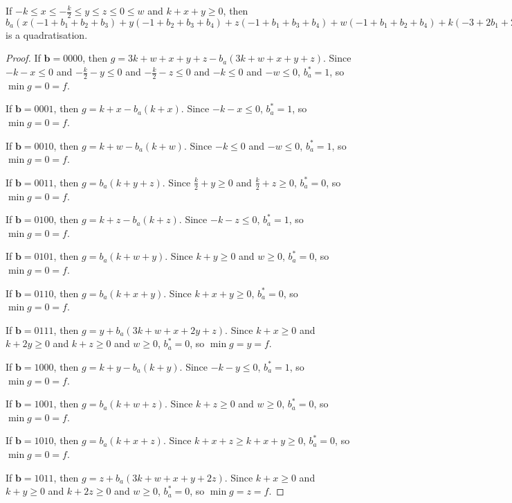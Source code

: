 \documentclass[11pt]{scrartcl}
\newcommand{\vc}[1]{\boldsymbol{#1}}
\begin{document}
\begin{lemma}
 If $-k\le x \le -\frac{k}{2} \le y \le z \le 0 \le w$ and $k + x+ y \ge 0$, then $b_a(x(-1+b_1+b_2+b_3)+y(-1+b_2+b_3+b_4)+z(-1+b_1+b_3+b_4)+w(-1+b_1+b_2+b_4)+k(-3+2b_1+2b_2+2b_3+2b_4))+x(+1 -b_1-b_2-b_3+b_1b_2+b_1b_3+b_2b_3)+y(+1 -b_2-b_3-b_4+b_2b_3+b_2b_4+b_3b_4)+z(+1 -b_1-b_3-b_4+b_1b_3+b_1b_4+b_3b_4)+w(+1 -b_1-b_2-b_4+b_1b_2+b_1b_4+b_2b_4)+k(+3 -2 b_1-2 b_2-2 b_3-2 b_4+b_1b_2+b_1b_3+b_1b_4+b_2b_3+b_2b_4+b_3b_4)$ is a quadratisation.\\
 \end{lemma}

\begin{proof}
If $\vc b = 0000$, then $g = 3k + w + x + y + z - b_a(3k + w + x + y + z)$.
Since $-k - x \le 0$ and $-\frac{k}{2} - y \le 0$ and $-\frac{k}{2} - z \le 0$ and $-k \le 0$ and $-w \le 0$,
$b_a^* = 1$, so $\min g = 0 = f$.

If $\vc b = 0001$, then $g = k + x - b_a(k + x)$.
Since $-k - x \le 0$, $b_a^* = 1$, so $\min g = 0 = f$.

If $\vc b = 0010$, then $g = k + w - b_a(k + w)$.
Since $-k \le 0$ and $-w \le 0$, $b_a^* = 1$, so $\min g = 0 = f$.

If $\vc b = 0011$, then $g = b_a(k + y + z)$.
Since  $\frac{k}{2} + y \ge 0$ and $\frac{k}{2} + z \ge 0$, $b_a^* = 0$, so $\min g = 0 = f$. 

If $\vc b = 0100$, then $g = k + z - b_a(k + z)$.
Since $-k - z \le 0$, $b_a^* = 1$, so $\min g = 0 = f$.

If $\vc b = 0101$, then $g = b_a(k + w + y)$.
Since $k + y \ge 0$ and $w \ge 0$, $b_a^* = 0$, so $\min g = 0 = f$.

If $\vc b = 0110$, then $g = b_a(k + x + y)$.
Since $k + x + y \ge 0$, $b_a^* = 0$, so $\min g = 0 = f$.

If $\vc b = 0111$, then $g = y + b_a(3k + w + x + 2y + z)$.
Since $k + x \ge 0 $ and $k + 2y \ge 0 $ and $k + z \ge 0$ and $w \ge 0 $, $b_a^* = 0$, so $\min g = y = f$.

If $\vc b = 1000$, then $g = k + y - b_a(k + y)$.
Since $-k - y \le 0$, $b_a^* = 1$, so $\min g = 0 = f$.

If $\vc b = 1001$, then $g = b_a(k + w + z)$.
Since $k + z \ge 0$ and $w \ge 0$, $b_a^* = 0$, so $\min g = 0 = f$.

If $\vc b = 1010$, then $g = b_a(k + x + z)$.
Since $k + x + z \ge k + x + y \ge 0$, $b_a^* = 0$, so $\min g = 0 = f$.

If $\vc b = 1011$, then $g = z + b_a(3k + w + x + y + 2z)$.
Since $k + x \ge 0 $ and $k + y \ge 0$ and $k + 2z \ge 0$ and $w \ge 0$, $b_a^* = 0$, so $\min g = z = f$.


\end{proof}
\end{document}
